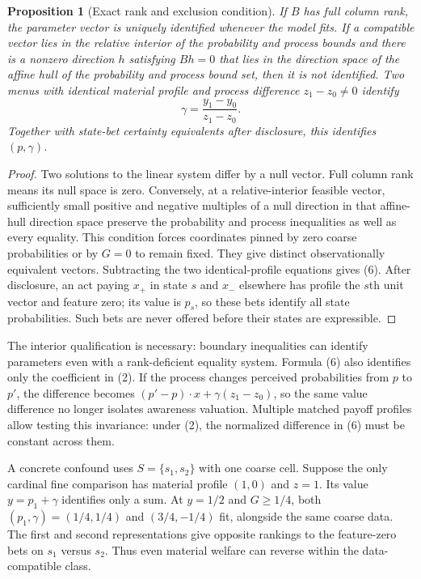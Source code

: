 \documentclass[11pt]{article}
\newtheorem{proposition}[theorem]{Proposition}
\theoremstyle{remark}
\begin{document}
\begin{proposition}[Exact rank and exclusion condition]
If $B$ has full column rank, the parameter vector is uniquely identified whenever the model fits. If a compatible vector lies in the relative interior of the probability and process bounds and there is a nonzero direction $h$ satisfying $Bh=0$ that lies in the direction space of the affine hull of the probability and process bound set, then it is not identified. Two menus with identical material profile and process difference $z_1-z_0\ne0$ identify
\[
 \gamma=\frac{y_1-y_0}{z_1-z_0}.                        \tag{6}
\]
Together with state-bet certainty equivalents after disclosure, this identifies $(p,\gamma)$.
\end{proposition}
\begin{proof}
Two solutions to the linear system differ by a null vector. Full column rank means its null space is zero. Conversely, at a relative-interior feasible vector, sufficiently small positive and negative multiples of a null direction in that affine-hull direction space preserve the probability and process inequalities as well as every equality. This condition forces coordinates pinned by zero coarse probabilities or by $G=0$ to remain fixed. They give distinct observationally equivalent vectors. Subtracting the two identical-profile equations gives (6). After disclosure, an act paying $x_+$ in state $s$ and $x_-$ elsewhere has profile the $s$th unit vector and feature zero; its value is $p_s$, so these bets identify all state probabilities. Such bets are never offered before their states are expressible.
\end{proof}

The interior qualification is necessary: boundary inequalities can identify parameters even with a rank-deficient equality system. Formula (6) also identifies only the coefficient in (2). If the process changes perceived probabilities from $p$ to $p'$, the difference becomes
$(p'-p)\cdot x+\gamma(z_1-z_0)$, so the same value difference no longer isolates awareness valuation. Multiple matched payoff profiles allow testing this invariance: under (2), the normalized difference in (6) must be constant across them.

A concrete confound uses $S=\{s_1,s_2\}$ with one coarse cell. Suppose the only cardinal fine comparison has material profile $(1,0)$ and $z=1$. Its value $y=p_1+\gamma$ identifies only a sum. At $y=1/2$ and $G\geq1/4$, both $(p_1,\gamma)=(1/4,1/4)$ and $(3/4,-1/4)$ fit, alongside the same coarse data. The first and second representations give opposite rankings to the feature-zero bets on $s_1$ versus $s_2$. Thus even material welfare can reverse within the data-compatible class.
\end{document}
